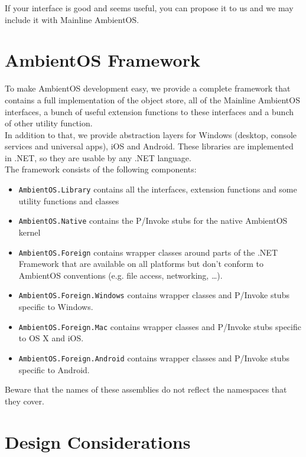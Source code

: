 \documentclass[a4paper]{article}
\begin{document}
If your interface is good and seems useful, you can propose it to us and we may include it with Mainline AmbientOS.



\section{AmbientOS Framework}

To make AmbientOS development easy, we provide a complete framework that contains a full implementation of the object store, all of the Mainline AmbientOS interfaces, a bunch of useful extension functions to these interfaces and a bunch of other utility function. \\
In addition to that, we provide abstraction layers for Windows (desktop, console services and universal apps), iOS and Android. These libraries are implemented in .NET, so they are usable by any .NET language. \\

The framework consists of the following components:

\begin{itemize}
  \item {\tt AmbientOS.Library} contains all the interfaces, extension functions and some utility functions and classes
  \item {\tt AmbientOS.Native} contains the P/Invoke stubs for the native AmbientOS kernel
  \item {\tt AmbientOS.Foreign} contains wrapper classes around parts of the .NET Framework that are available on all platforms but don't conform to AmbientOS conventions (e.g. file access, networking, \ldots).
  \item {\tt AmbientOS.Foreign.Windows} contains wrapper classes and P/Invoke stubs specific to Windows.
  \item {\tt AmbientOS.Foreign.Mac} contains wrapper classes and P/Invoke stubs specific to OS X and iOS.
  \item {\tt AmbientOS.Foreign.Android} contains wrapper classes and P/Invoke stubs specific to Android.
\end{itemize}

Beware that the names of these assemblies do not reflect the namespaces that they cover.




\section{Design Considerations}
\end{document}

